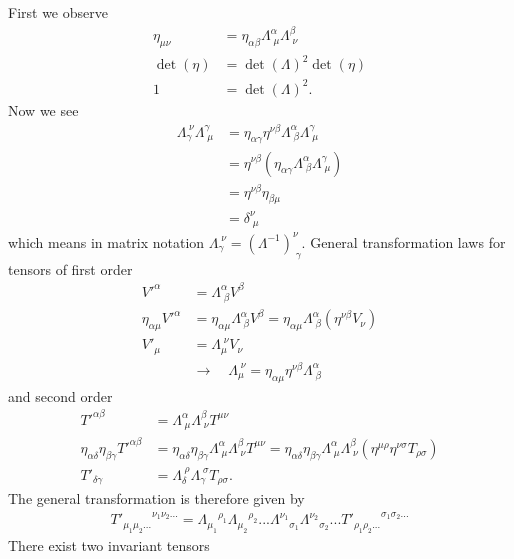 \documentclass[10pt,a4paper]{book}
\theoremstyle{definition}
\begin{document}
First we observe
\begin{align}
    \eta_{\mu\nu} &= \eta_{\alpha\beta}\Lambda^\alpha_{\;\mu} \Lambda^\beta_{\;\nu}\\
    \det(\eta)&=\det(\Lambda)^2\det(\eta)\\
    1&=\det(\Lambda)^2.
\end{align}
Now we see
\begin{align}
    \Lambda_\gamma^{\;\nu}\Lambda^\gamma_{\;\mu}&=\eta_{\alpha\gamma}\eta^{\nu\beta}\Lambda^\alpha_{\;\beta} \Lambda^\gamma_{\;\mu}\\
    &=\eta^{\nu\beta}(\eta_{\alpha\gamma}\Lambda^\alpha_{\;\beta} \Lambda^\gamma_{\;\mu})\\
    &=\eta^{\nu\beta}\eta_{\beta\mu}\\
    &=\delta^\nu_{\;\mu}
\end{align}
which means in matrix notation $\Lambda_\gamma^{\;\nu}=(\Lambda^{-1})^\nu_{\;\gamma}$.
General transformation laws for tensors of first order
\begin{align}
    V'^\alpha&=\Lambda^\alpha_{\;\beta}V^\beta\\
    \eta_{\alpha\mu}V'^\alpha&=\eta_{\alpha\mu}\Lambda^\alpha_{\;\beta}V^\beta=\eta_{\alpha\mu}\Lambda^\alpha_{\;\beta}(\eta^{\nu\beta}V_\nu)\\
    V'_\mu&=\Lambda_\mu^{\;\nu}V_\nu\\
    &\rightarrow\quad \Lambda_\mu^{\;\nu} = \eta_{\alpha\mu}\eta^{\nu\beta}\Lambda^\alpha_{\;\beta}
\end{align}
and second order
\begin{align}
    T'^{\alpha\beta}&=\Lambda^\alpha_{\;\mu}\Lambda^\beta_{\;\nu}T^{\mu\nu}\\
    \eta_{\alpha\delta}\eta_{\beta\gamma}T'^{\alpha\beta}&=\eta_{\alpha\delta}\eta_{\beta\gamma}\Lambda^\alpha_{\;\mu}\Lambda^\beta_{\;\nu}T^{\mu\nu}=\eta_{\alpha\delta}\eta_{\beta\gamma}\Lambda^\alpha_{\;\mu}\Lambda^\beta_{\;\nu}(\eta^{\mu\rho}\eta^{\nu\sigma} T_{\rho\sigma})\\
    T'_{\delta\gamma}&=\Lambda_\delta^{\;\rho}\Lambda_\gamma^{\;\sigma}T_{\rho\sigma}.
\end{align}
The general transformation is therefore given by
\begin{align}
    {T'_{\mu_1\mu_2...}}^{\nu_1\nu_2...}={\Lambda_{\mu_1}}^{\rho_1}{\Lambda_{\mu_2}}^{\rho_2}... {\Lambda^{\nu_1}}_{\sigma_1}{\Lambda^{\nu_2}}_{\sigma_2}... {T'_{\rho_1\rho_2...}}^{\sigma_1\sigma_2...}
\end{align}
There exist two invariant tensors
\end{document}

